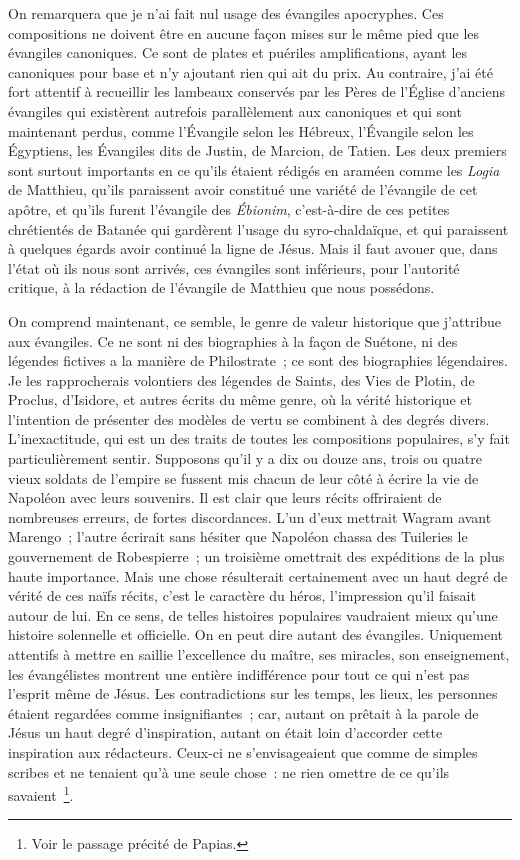 \documentclass[french,twoside]{book} %
\begin{document}
On remarquera que je n’ai fait nul usage des évangiles apocryphes. Ces compositions ne doivent être en aucune façon mises sur le même pied que les évangiles canoniques. Ce sont de plates et puériles amplifications, ayant les canoniques pour base et n’y ajoutant rien qui ait du prix. Au contraire, j’ai été fort attentif à recueillir les lambeaux conservés par les Pères de l’Église d’anciens évangiles qui existèrent autrefois parallèlement aux canoniques et qui sont maintenant perdus, comme l’Évangile selon les Hébreux, l’Évangile selon les Égyptiens, les Évangiles dits de Justin, de Marcion, de Tatien. Les deux premiers sont surtout importants en ce qu’ils étaient rédigés en araméen comme les {\itshape Logia} de Matthieu, qu’ils paraissent avoir constitué une variété de l’évangile de cet apôtre, et qu’ils furent l’évangile des {\itshape Ébionim}, c’est-à-dire de ces petites chrétientés de Batanée qui gardèrent l’usage du syro-chaldaïque, et qui paraissent à quelques égards avoir continué la ligne de Jésus. Mais il faut avouer que, dans l’état où ils nous sont arrivés, ces évangiles sont inférieurs, pour l’autorité critique, à la rédaction de l’évangile de Matthieu que nous possédons.\par
On comprend maintenant, ce semble, le genre de valeur historique que j’attribue aux évangiles. Ce ne sont ni des biographies à la façon de Suétone, ni des légendes fictives a la manière de Philostrate ; ce sont des biographies légendaires. Je les rapprocherais volontiers des légendes de Saints, des Vies de Plotin, de Proclus, d’Isidore, et autres écrits du même genre, où la vérité historique et l’intention de présenter des modèles de vertu se combinent à des degrés divers. L’inexactitude, qui est un des traits de toutes les compositions populaires, s’y fait particulièrement sentir. Supposons qu’il y a dix ou douze ans, trois ou quatre vieux soldats de l’empire se fussent mis chacun de leur côté à écrire la vie de Napoléon avec leurs souvenirs. Il est clair que leurs récits offriraient de nombreuses erreurs, de fortes discordances. L’un d’eux mettrait Wagram avant Marengo ; l’autre écrirait sans hésiter que Napoléon chassa des Tuileries le gouvernement de Robespierre ; un troisième omettrait des expéditions de la plus haute importance. Mais une chose résulterait certainement avec un haut degré de vérité de ces naïfs récits, c’est le caractère du héros, l’impression qu’il faisait autour de lui. En ce sens, de telles histoires populaires vaudraient mieux qu’une histoire solennelle et officielle. On en peut dire autant des évangiles. Uniquement attentifs à mettre en saillie l’excellence du maître, ses miracles, son enseignement, les évangélistes montrent une entière indifférence pour tout ce qui n’est pas l’esprit même de Jésus. Les contradictions sur les temps, les lieux, les personnes étaient regardées comme insignifiantes ; car, autant on prêtait à la parole de Jésus un haut degré d’inspiration, autant on était loin d’accorder cette inspiration aux rédacteurs. Ceux-ci ne s’envisageaient que comme de simples scribes et ne tenaient qu’à une seule chose : ne rien omettre de ce qu’ils savaient \footnote{Voir le passage précité de Papias.}.\par
\end{document}
